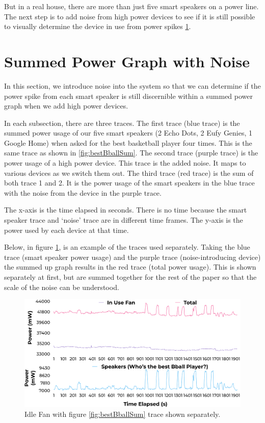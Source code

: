 But in a real house, there are more than just five smart speakers on a power line. The next step is to add noise from high power devices to see if it is still possible to visually determine the device in use from power spikes \ref{sumPowerGraphWithNoise}.

\section{Summed Power Graph with Noise}
\label{sumPowerGraphWithNoise}
In this section, we introduce noise into the system so that we can determine if the power spike from each smart speaker is still discernible within a summed power graph when we add high power devices.

In each subsection, there are three traces. The first trace (blue trace) is the summed power usage of our five smart speakers (2 Echo Dots, 2 Eufy Genies, 1 Google Home) when asked for the best basketball player four times. This is the same trace as shown in \ref{fig:bestBballSum}. The second trace (purple trace) is the power usage of a high power device. This trace is the added noise. It maps to various devices as we switch them out. The third trace (red trace) is the sum of both trace 1 and 2. It is the power usage of the smart speakers in the blue trace with the noise from the device in the purple trace.

The x-axis is the time elapsed in seconds. There is no time because the smart speaker trace and `noise' trace are in different time frames. The y-axis is the power used by each device at that time.

Below, in figure \ref{fig:fanIdleSeperate}, is an example of the traces used separately. Taking the blue trace (smart speaker power usage) and the purple trace (noise-introducing device) the summed up graph results in the red trace (total power usage). This is shown separately at first, but are summed together for the rest of the paper so that the scale of the noise can be understood.

\begin{figure}[H]
  \centering
  \includegraphics[width=1\textwidth]{figures/inUseFanNoiseSeperate.png}
  \caption{Idle Fan with figure \ref{fig:bestBballSum} trace shown separately.}
  \label{fig:fanIdleSeperate}
\end{figure}

